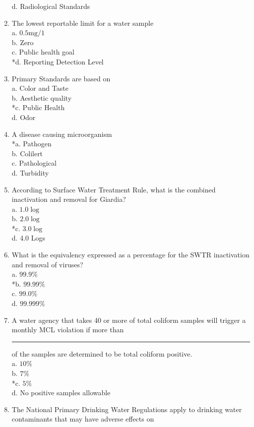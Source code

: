 \begin{enumerate}[1.]
d. Radiological Standards\\
\item The lowest reportable limit for a water sample\\
a. $0.5 \mathrm{mg} / 1$\\
b. Zero\\
c. Public health goal\\
*d. Reporting Detection Level\\
\item Primary Standards are based on\\
a. Color and Taste\\
b. Aesthetic quality\\
*c. Public Health\\
d. Odor\\
\item A disease causing microorganism\\
*a. Pathogen\\
b. Colilert\\
c. Pathological\\
d. Turbidity\\
\item According to Surface Water Treatment Rule, what is the combined inactivation and removal for Giardia?\\
a. $1.0 \log$\\
b. $2.0 \log$\\
*c. $3.0 \log$\\
d. 4.0 Logs\\
\item What is the equivalency expressed as a percentage for the SWTR inactivation and removal of viruses?\\
a. $99.9 \%$\\
*b. $99.99 \%$\\
c. $99.0 \%$\\
d. $99.999 \%$\\
\item A water agency that takes 40 or more of total coliform samples will trigger a monthly MCL violation if more than \rule{1.5cm}{0.5pt} of the samples are determined to be total coliform positive.\\
a. $10 \%$\\
b. $7 \%$\\
*c. $5 \%$\\
d. No positive samples allowable\\
\item The National Primary Drinking Water Regulations apply to drinking water contaminants that may have adverse effects on\\

\end{enumerate}
